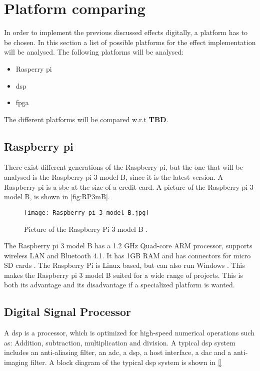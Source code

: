 \section{Platform comparing}
In order to implement the previous discussed effects digitally, a platform has to be chosen. In this section a list of possible platforms for the effect implementation will be analysed. The following platforms will be analysed:

\begin{itemize}
\item Rasperry pi
\item \gls{dsp}
\item \gls{fpga}
\end{itemize}

The different platforms will be compared w.r.t \textbf{TBD}.

\subsection{Raspberry pi}
There exist different generations of the Raspberry pi, but the one that will be analysed is the Raspberry pi 3 model B, since it is the latest version. 
A Raspberry pi is a \gls{sbc} at the size of a credit-card. A picture of the Raspberry pi 3 model B, is shown in \autoref{fig:RP3mB}.

\begin{figure}[h]
	\centering
		\texttt{[image: Raspberry\_pi\_3\_model\_B.jpg]}
		\caption{Picture of the Raspberry Pi 3 model B \cite{Rasperry_pi}.}
		\label{fig:RP3mB}
\end{figure}

The Raspberry pi 3 model B has a 1.2 GHz Quad-core ARM processor, supports wireless LAN and Bluetooth 4.1. It has 1GB RAM and has connectors for micro SD cards \cite{Raspberry_pi}.
The Raspberry Pi is Linux based, but can also run Windows \cite{sparkfun_Raspberry_pi}. This makes the Raspberry pi 3 model B suited for a wide range of projects. This is both its advantage and its disadvantage if a specialized platform is wanted. 

\subsection{Digital Signal Processor}
A \gls{dsp} is a processor, which is optimized for high-speed numerical operations such as: Addition, subtraction, multiplication and division. A typical \gls{dsp} system includes an anti-aliasing filter, an \gls{adc}, a \gls{dsp}, a host interface, a \gls{dac} and a anti-imaging filter. A block diagram of the typical \gls{dsp} system is shown in \autoref{}

